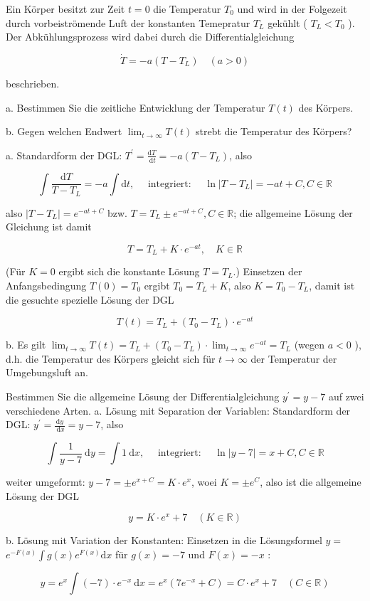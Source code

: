 \begin{example}
    Ein Körper besitzt zur Zeit $t=0$ die Temperatur $T_{0}$ und wird in der Folgezeit durch vorbeiströmende Luft der konstanten Temepratur $T_{L}$ gekühlt ( $T_{L}<T_{0}$ ). Der Abkühlungsprozess wird dabei durch die Differentialgleichung

    $$
    \dot{T}=-a\left(T-T_{L}\right) \quad(a>0)
    $$
    
    beschrieben.
    
    a. Bestimmen Sie die zeitliche Entwicklung der Temperatur $T(t)$ des Körpers.
    
    b. Gegen welchen Endwert $\lim _{t \rightarrow \infty} T(t)$ strebt die Temperatur des Körpers?

\tcblower
a. Standardform der DGL: $T^{\prime}=\frac{\mathrm{d} T}{\mathrm{~d} t}=-a\left(T-T_{L}\right)$, also

$$
\int \frac{\mathrm{d} T}{T-T_{L}}=-a \int \mathrm{d} t, \quad \text { integriert: } \quad \ln \left|T-T_{L}\right|=-a t+C, C \in \mathbb{R}
$$

also $\left|T-T_{L}\right|=e^{-a t+C}$ bzw. $T=T_{L} \pm e^{-a t+C}, C \in \mathbb{R}$; die allgemeine Lösung der Gleichung ist damit

$$
T=T_{L}+K \cdot e^{-a t}, \quad K \in \mathbb{R}
$$

(Für $K=0$ ergibt sich die konstante Lösung $T=T_{L}$.) Einsetzen der Anfangsbedingung $T(0)=T_{0}$ ergibt $T_{0}=T_{L}+K$, also $K=T_{0}-T_{L}$, damit ist die gesuchte spezielle Lösung der DGL

$$
T(t)=T_{L}+\left(T_{0}-T_{L}\right) \cdot e^{-a t}
$$

b. Es gilt $\lim _{t \rightarrow \infty} T(t)=T_{L}+\left(T_{0}-T_{L}\right) \cdot \lim _{t \rightarrow \infty} e^{-a t}=T_{L}$ (wegen $a<0$ ), d.h. die Temperatur des Körpers gleicht sich für $t \rightarrow \infty$ der Temperatur der Umgebungsluft an.

\end{example}

\begin{example}
    Bestimmen Sie die allgemeine Lösung der Differentialgleichung
    $
    y^{\prime}=y-7
    $
    auf zwei verschiedene Arten.
\tcblower
a. Lösung mit Separation der Variablen: Standardform der DGL: $y^{\prime}=\frac{\mathrm{d} y}{\mathrm{~d} x}=y-7$, also

$$
\int \frac{1}{y-7} \mathrm{~d} y=\int 1 \mathrm{~d} x, \quad \text { integriert: } \quad \ln |y-7|=x+C, C \in \mathbb{R}
$$

weiter umgeformt: $y-7= \pm e^{x+C}=K \cdot e^{x}$, woei $K= \pm e^{C}$, also ist die allgemeine Lösung der DGL

$$
y=K \cdot e^{x}+7 \quad(K \in \mathbb{R})
$$

b. Lösung mit Variation der Konstanten: Einsetzen in die Lösungsformel $y=$ $e^{-F(x)} \int g(x) e^{F(x)} \mathrm{d} x$ für $g(x)=-7$ und $F(x)=-x$ :

$$
y=e^{x} \int(-7) \cdot e^{-x} \mathrm{~d} x=e^{x}\left(7 e^{-x}+C\right)=C \cdot e^{x}+7 \quad(C \in \mathbb{R})
$$
\end{example}

